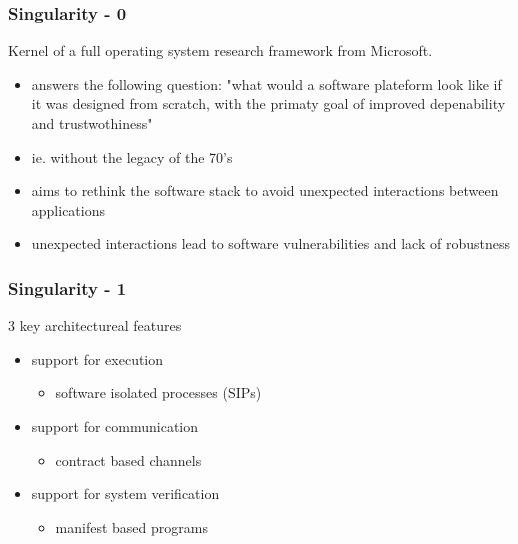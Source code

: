 \begin{frame}
  \frametitle{Singularity - 0}

  Kernel of a full operating system research framework from Microsoft.

  \begin{itemize}
    \item answers the following question: "what would a software plateform look like if it was designed from scratch, with the primaty goal of improved depenability and trustwothiness"
    \item ie. without the legacy of the 70's
    \item aims to rethink the software stack to avoid unexpected interactions between applications
    \item unexpected interactions lead to software vulnerabilities and lack of robustness
  \end{itemize}

\end{frame}

\begin{frame}
  \frametitle{Singularity - 1}
  3 key architectureal features
  \begin{itemize}
    \item support for execution
      \begin{itemize} \item software isolated processes (SIPs) \end{itemize}
    \item support for communication
      \begin{itemize} \item contract based channels \end{itemize}
    \item support for system verification
      \begin{itemize} \item manifest based programs \end{itemize}
  \end{itemize}
\end{frame}


